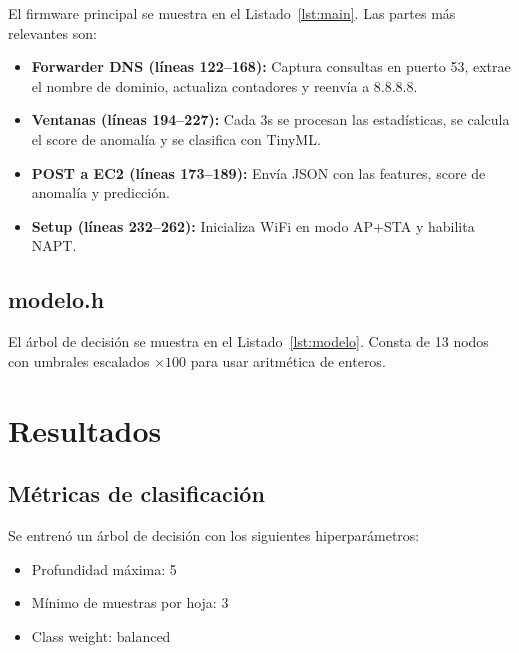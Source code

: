 \documentclass[12pt,a4paper]{article}
\begin{document}
El firmware principal se muestra en el Listado~\ref{lst:main}. Las partes más relevantes son:

\begin{itemize}
    \item \textbf{Forwarder DNS (líneas 122--168):} Captura consultas en puerto 53, extrae el nombre de dominio, actualiza contadores y reenvía a 8.8.8.8.
    \item \textbf{Ventanas (líneas 194--227):} Cada 3s se procesan las estadísticas, se calcula el score de anomalía y se clasifica con TinyML.
    \item \textbf{POST a EC2 (líneas 173--189):} Envía JSON con las features, score de anomalía y predicción.
    \item \textbf{Setup (líneas 232--262):} Inicializa WiFi en modo AP+STA y habilita NAPT.
\end{itemize}



\subsection{modelo.h}
\label{sec:modelo-h}

El árbol de decisión se muestra en el Listado~\ref{lst:modelo}. Consta de 13 nodos con umbrales escalados $\times 100$ para usar aritmética de enteros.



\section{Resultados}
\label{sec:resultados}

\subsection{Métricas de clasificación}
\label{sec:metricas}

Se entrenó un árbol de decisión con los siguientes hiperparámetros:
\begin{itemize}
    \item Profundidad máxima: 5
    \item Mínimo de muestras por hoja: 3
    \item Class weight: balanced
\end{itemize}
\end{document}
